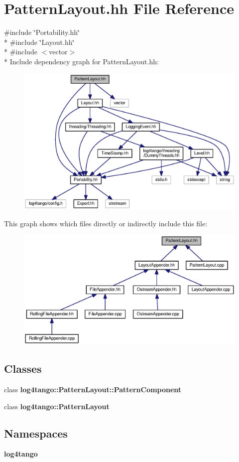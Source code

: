 \section{Pattern\-Layout.\-hh File Reference}
\label{PatternLayout_8hh}
{\ttfamily \#include \char`\"{}Portability.\-hh\char`\"{}}\\*
{\ttfamily \#include \char`\"{}Layout.\-hh\char`\"{}}\\*
{\ttfamily \#include $<$vector$>$}\\*
Include dependency graph for Pattern\-Layout.\-hh\-:
\nopagebreak
\begin{figure}[H]
\begin{center}
\leavevmode
\includegraphics[width=350pt]{db/d0c/PatternLayout_8hh__incl}
\end{center}
\end{figure}
This graph shows which files directly or indirectly include this file\-:
\nopagebreak
\begin{figure}[H]
\begin{center}
\leavevmode
\includegraphics[width=350pt]{de/d01/PatternLayout_8hh__dep__incl}
\end{center}
\end{figure}
\subsection*{Classes}
\begin{DoxyCompactItemize}
\item 
class {\bf log4tango\-::\-Pattern\-Layout\-::\-Pattern\-Component}
\item 
class {\bf log4tango\-::\-Pattern\-Layout}
\end{DoxyCompactItemize}
\subsection*{Namespaces}
\begin{DoxyCompactItemize}
\item 
{\bf log4tango}
\end{DoxyCompactItemize}
